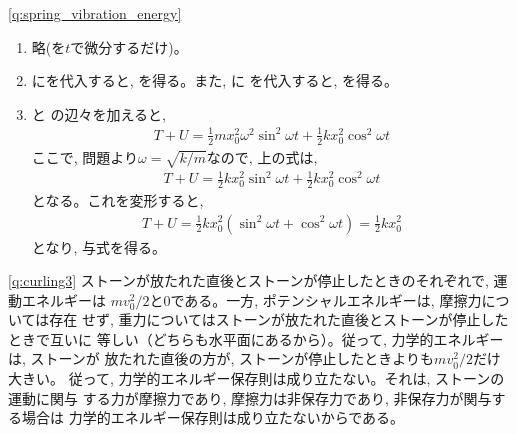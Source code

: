 \ref{q:spring_vibration_energy}
\begin{enumerate}
\item 略(を$t$で微分するだけ)。
\item {}にを代入すると, 
を得る。また, に
を代入すると, 
を得る。
\item 
{}と
の辺々を加えると,
\begin{eqnarray*}
T+U=\frac{1}{2}mx_0^2\omega^2\sin^2\omega t+\frac{1}{2}kx_0^2\cos^2\omega t
\end{eqnarray*}
ここで, 問題より$\omega=\sqrt{k/m}$なので, 上の式は, 
\begin{eqnarray*}
T+U=\frac{1}{2}kx_0^2\sin^2\omega t+\frac{1}{2}kx_0^2\cos^2\omega t
\end{eqnarray*}
となる。これを変形すると, 
\begin{eqnarray*}
T+U=\frac{1}{2}kx_0^2(\sin^2\omega t+\cos^2\omega t)=\frac{1}{2}kx_0^2
\end{eqnarray*}
となり, 与式を得る。
\end{enumerate}

\ref{q:curling3} 
ストーンが放たれた直後とストーンが停止したときのそれぞれで, 運動エネルギーは
$mv_0^2/2$と$0$である。一方, ポテンシャルエネルギーは, 摩擦力については存在
せず, 重力についてはストーンが放たれた直後とストーンが停止したときで互いに
等しい（どちらも水平面にあるから）。従って, 力学的エネルギーは, ストーンが
放たれた直後の方が, ストーンが停止したときよりも$mv_0^2/2$だけ大きい。
従って, 力学的エネルギー保存則は成り立たない。それは, ストーンの運動に関与
する力が摩擦力であり, 摩擦力は非保存力であり, 非保存力が関与する場合は
力学的エネルギー保存則は成り立たないからである。
\vspace{0.2cm}


